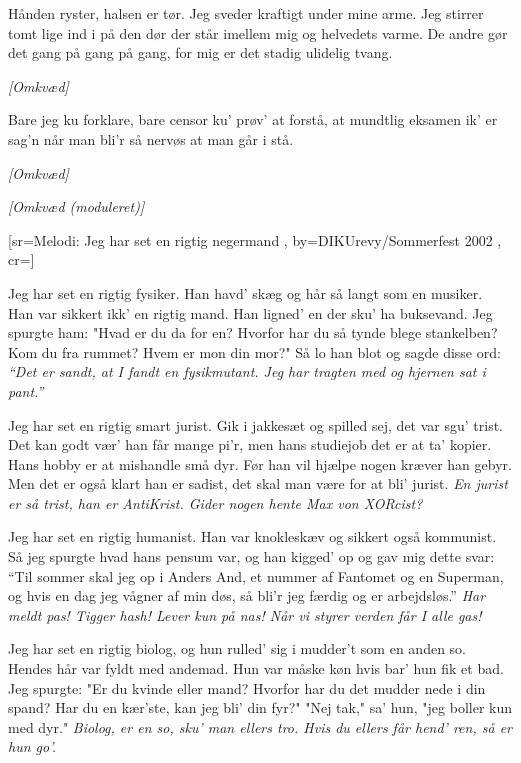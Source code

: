 \documentclass[pdftex,12pt]{article}
\begin{document}
\begin{songs}{}
\beginverse
Hånden ryster, halsen er tør.
Jeg sveder kraftigt under mine arme.
Jeg stirrer tomt lige ind i på den dør
der står imellem mig og helvedets varme.
De andre gør det gang på gang på gang,
for mig er det stadig ulidelig tvang.
\endverse

\beginverse
\emph{[Omkvæd]}
\endverse

\beginverse
Bare jeg ku forklare,
bare censor ku' prøv' at forstå,
at mundtlig eksamen ik' er sag'n når man bli'r så nervøs at man går i stå.
\endverse

\beginverse
\emph{[Omkvæd]}
\endverse

\beginverse
\emph{[Omkvæd (moduleret)]}
\endverse
\endsong



﻿[sr={Melodi: Jeg har set en rigtig negermand}
,
by={DIKUrevy/Sommerfest 2002}
,
cr={}]\hypertarget{Jeg har set en rigtig .*}{}
\label{song73}

\beginverse
Jeg har set en rigtig fysiker.
Han havd’ skæg og hår så langt som en musiker.
Han var sikkert ikk’ en rigtig mand.
Han ligned’ en der sku’ ha buksevand.
Jeg spurgte ham: "Hvad er du da for en?
Hvorfor har du så tynde blege stankelben?
Kom du fra rummet? Hvem er mon din mor?"
Så lo han blot og sagde disse ord:
\emph{``Det er sandt, at I fandt en fysikmutant.
Jeg har tragten med og hjernen sat i pant.''}

\endverse
\beginverse
Jeg har set en rigtig smart jurist.
Gik i jakkesæt og spilled sej, det var sgu’ trist.
Det kan godt vær’ han får mange pi’r,
men hans studiejob det er at ta’ kopier.
Hans hobby er at mishandle små dyr.
Før han vil hjælpe nogen kræver han gebyr.
Men det er også klart han er sadist,
det skal man være for at bli’ jurist.
\emph{En jurist er så trist, han er AntiKrist.
Gider nogen hente Max von XORcist?}

\endverse
\beginverse
Jeg har set en rigtig humanist.
Han var knokleskæv og sikkert også kommunist.
Så jeg spurgte hvad hans pensum var,
og han kigged’ op og gav mig dette svar:
``Til sommer skal jeg op i Anders And,
et nummer af Fantomet og en Superman,
og hvis en dag jeg vågner af min døs,
så bli’r jeg færdig og er arbejdsløs.''
\emph{Har meldt pas! Tigger hash! Lever kun på nas!
Når vi styrer verden får I alle gas!}

\endverse
\beginverse
Jeg har set en rigtig biolog,
og hun rulled’ sig i mudder’t som en anden so.
Hendes hår var fyldt med andemad.
Hun var måske køn hvis bar’ hun fik et bad.
Jeg spurgte: "Er du kvinde eller mand?
Hvorfor har du det mudder nede i din spand?
Har du en kær’ste, kan jeg bli’ din fyr?"
"Nej tak," sa’ hun, "jeg boller kun med dyr."
\emph{Biolog, er en so, sku’ man ellers tro.
Hvis du ellers får hend’ ren, så er hun go’.}


\end{songs}
\end{document}
